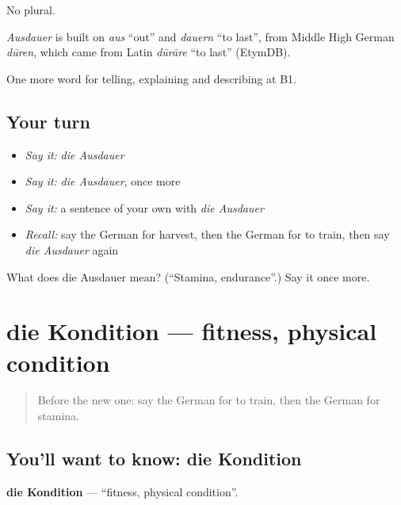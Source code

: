 No plural.

\begin{cousinweb}
\emph{Ausdauer} is built on \emph{aus} \textquotedblleft{}out\textquotedblright{} and \emph{dauern} \textquotedblleft{}to last\textquotedblright{}, from Middle High German \emph{dūren}, which came from Latin \emph{dūrāre} \textquotedblleft{}to last\textquotedblright{} (EtymDB).
\end{cousinweb}

\begin{grammarlens}[title={What you've built}]
One more word for telling, explaining and describing at B1.
\end{grammarlens}

\subsection*{Your turn}
\begin{itemize}
\raggedright
  \item \emph{Say it:} \emph{die Ausdauer}
  \item \emph{Say it:} \emph{die Ausdauer}, once more
  \item \emph{Say it:} a sentence of your own with \emph{die Ausdauer}
  \item \emph{Recall:} say the German for harvest, then the German for to train, then say \emph{die Ausdauer} again
\end{itemize}

\begin{tcolorbox}[breakable,colback=teal!4,colframe=teal!35!black,title={Before you move on}]
What does die Ausdauer mean? (\textquotedblleft{}Stamina, endurance\textquotedblright{}.) Say it once more.
\end{tcolorbox}
\section[die Kondition]{die Kondition — fitness, physical condition}

\label{lesson:GE-C505-kondition}



\begin{quote}
Before the new one: say the German for to train, then the German for stamina.
\end{quote}

\subsection*{You'll want to know: die Kondition}
\textbf{die Kondition} — \textquotedblleft{}fitness, physical condition\textquotedblright{}.

